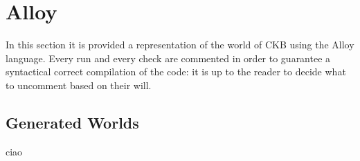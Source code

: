 \chapter{Alloy}

In this section it is provided a representation of the world of CKB using the Alloy language. Every
run and every check are commented in order to guarantee a syntactical correct compilation of the
code: it is up to the reader to decide what to uncomment based on their will.



\section{Generated Worlds}

ciao